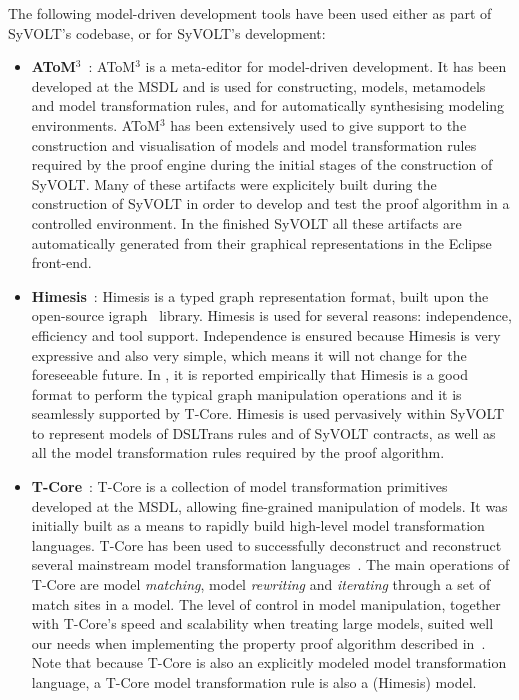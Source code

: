 The following model-driven development tools have been used either as part of
SyVOLT's codebase, or for SyVOLT's development:
\begin{itemize}

  \item \textbf{AToM$^3$}~\cite{atom3:2002}: AToM$^3$ is a meta-editor for
  model-driven development. It has been developed at the MSDL and is used for constructing,
  models, metamodels and model transformation rules, and for automatically
  synthesising modeling environments.
  AToM$^3$ has been extensively used to give support to the construction and
  visualisation of models and model transformation rules required by the proof
  engine during the initial stages of the construction of SyVOLT. 
  Many of these artifacts were explicitely built during the construction
  of SyVOLT in order to develop and test the proof algorithm in a controlled
  environment. In the finished SyVOLT all these artifacts are automatically
  generated from their graphical representations in the Eclipse front-end.\\

  \item \textbf{Himesis}~\cite{Provost2006}: Himesis is a typed graph representation
  format, built upon the open-source igraph~\cite{igraphTool} library. 
Himesis is used for several reasons: independence, efficiency and tool support.
Independence is ensured because Himesis is very expressive and also very simple,
which means it will not change for the foreseeable future.
In \cite{Syriani2010b}, it is reported empirically that Himesis is a good format
to perform the typical graph manipulation operations and it is seamlessly
supported by T-Core.  
  Himesis is used pervasively within SyVOLT to represent models of 
  DSLTrans rules and of SyVOLT contracts, as well as all the model
  transformation rules required by the proof algorithm.\\
  
  \item \textbf{T-Core}~\cite{Syriani2010a}: T-Core is a collection of model transformation
  primitives developed at the MSDL, allowing fine-grained manipulation of
  models. It was initially built as a means to rapidly build
  high-level model transformation languages. T-Core has been used to
  successfully deconstruct and reconstruct several mainstream model transformation
  languages~\cite{}. The main operations of T-Core are model \emph{matching},
  model \emph{rewriting} and \emph{iterating} through a set of match sites in a model.
  The level of control in model manipulation, together with T-Core's speed and
  scalability when treating large models, suited well our needs when
  implementing the property proof algorithm described in~\cite{Lucio2014}. Note that because
  T-Core is also an explicitly modeled model transformation language, a T-Core
  model transformation rule is also a (Himesis) model.\\


\end{itemize}
